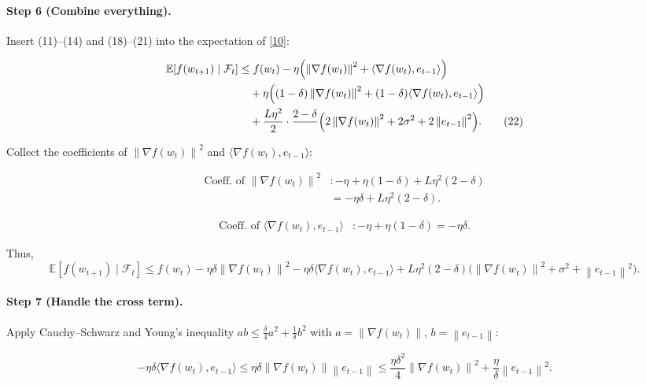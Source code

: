 \documentclass{article}
\newcommand{\E}{\mathbb{E}}
\newcommand{\norm}[1]{\left\|#1\right\|}
\begin{document}
\paragraph{Step 6 (Combine everything).}
Insert (11)–(14) and (18)–(21) into the expectation of \eqref{10}:

\begin{align}
\E\!\left[f(w_{t+1})\mid\mathcal{F}_{t}\right]
&\le f(w_{t})-\eta\Bigl(\norm{\nabla f(w_{t})}^{2}
+\langle\nabla f(w_{t}),e_{t-1}\rangle\Bigr)   \nonumber\\
&\quad +\eta\Bigl((1-\delta)\norm{\nabla f(w_{t})}^{2}
+(1-\delta)\langle\nabla f(w_{t}),e_{t-1}\rangle\Bigr) \nonumber\\
&\quad +\frac{L\eta^{2}}{2}\cdot\frac{2-\delta}{\;}\Bigl(2\norm{\nabla f(w_{t})}^{2}+2\sigma^{2}+2\norm{e_{t-1}}^{2}\Bigr). \tag{22}
\end{align}

Collect the coefficients of $\norm{\nabla f(w_{t})}^{2}$ and $\langle\nabla f(w_{t}),e_{t-1}\rangle$:

\[
\begin{aligned}
\text{Coeff. of }\norm{\nabla f(w_{t})}^{2}&:
-\eta +\eta(1-\delta)+L\eta^{2}(2-\delta) \\
&= -\eta\delta +L\eta^{2}(2-\delta). \tag{23}
\end{aligned}
\]

\[
\begin{aligned}
\text{Coeff. of }\langle\nabla f(w_{t}),e_{t-1}\rangle&:
-\eta +\eta(1-\delta)= -\eta\delta. \tag{24}
\end{aligned}
\]

Thus,
\[
\E\!\left[f(w_{t+1})\mid\mathcal{F}_{t}\right]
\le f(w_{t}) -\eta\delta\norm{\nabla f(w_{t})}^{2}
-\eta\delta\langle\nabla f(w_{t}),e_{t-1}\rangle
+L\eta^{2}(2-\delta)\bigl(\norm{\nabla f(w_{t})}^{2}+\sigma^{2}+\norm{e_{t-1}}^{2}\bigr). \tag{25}
\]

\paragraph{Step 7 (Handle the cross term).}
Apply Cauchy–Schwarz and Young’s inequality $ab\le \frac{\delta}{4}a^{2}+\frac{1}{\delta}b^{2}$ with $a=\norm{\nabla f(w_{t})}$,
$b=\norm{e_{t-1}}$:

\[
-\eta\delta\langle\nabla f(w_{t}),e_{t-1}\rangle
\le \eta\delta\norm{\nabla f(w_{t})}\norm{e_{t-1}}
\le \frac{\eta\delta^{2}}{4}\norm{\nabla f(w_{t})}^{2}
+\frac{\eta}{\delta}\norm{e_{t-1}}^{2}. \tag{26}
\]
\end{document}
